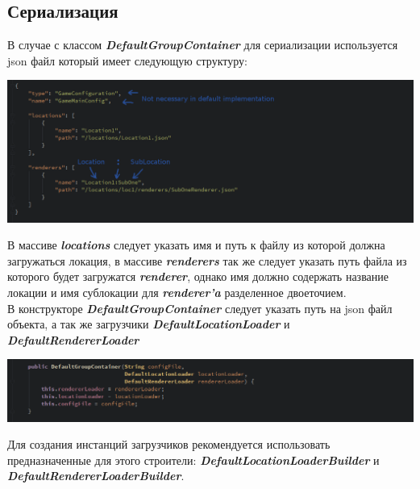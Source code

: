 \documentclass[11pt]{report}
\begin{document}
\subsection{Сериализация}
В случае с классом \textit{\textbf{DefaultGroupContainer}} для сериализации используется json файл который имеет следующую структуру: 
\begin{center}
	\includegraphics[width=1.2\linewidth]{img/13.png} 
  	\label{img:130} 
\end{center} 
В массиве \textit{\textbf{locations}} следует указать имя и путь к файлу из которой должна загружаться локация, в массиве \textit{\textbf{renderers}} так же следует указать путь файла из которого будет загружатся \textit{\textbf{renderer}}, однако имя должно содержать 
название локации и имя сублокации для \textit{\textbf{renderer'a}} разделенное двоеточием.\\ В конструкторе \textit{\textbf{DefaultGroupContainer}} следует указать путь на json файл объекта, а так же загрузчики \textit{\textbf{DefaultLocationLoader}} и \textit{\textbf{DefaultRendererLoader}}
\begin{center}
	\includegraphics[width=1.2\linewidth]{img/16.png} 
  	\label{img:160} 
\end{center} 
Для создания инстанций загрузчиков рекомендуется использовать предназначенные для этого строители: \textit{\textbf{DefaultLocationLoaderBuilder}} и \textit{\textbf{DefaultRendererLoaderBuilder}}.
 
\newpage
\end{document}
